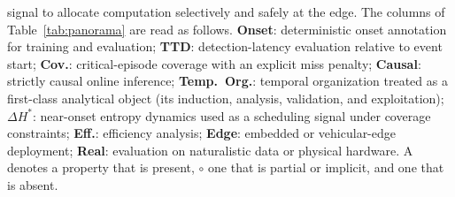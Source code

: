\documentclass[a4paper,fleqn]{cas-dc}
\begin{document}
signal to allocate computation selectively and safely at the edge.
The columns of Table~\ref{tab:panorama} are read as follows.
\textbf{Onset}: deterministic onset annotation for training and evaluation;
\textbf{TTD}: detection-latency evaluation relative to event start;
\textbf{Cov.}: critical-episode coverage with an explicit miss penalty;
\textbf{Causal}: strictly causal online inference; \textbf{Temp.~Org.}:
temporal organization treated as a first-class analytical object (its
induction, analysis, validation, and exploitation); \textbf{$\Delta H^{\ast}$}:
near-onset entropy dynamics used as a scheduling signal under coverage
constraints; \textbf{Eff.}: efficiency analysis; \textbf{Edge}: embedded or
vehicular-edge deployment; \textbf{Real}: evaluation on naturalistic data or
physical hardware. A  denotes a property that is present, $\circ$ one
that is partial or implicit, and  one that is absent.
\end{document}
